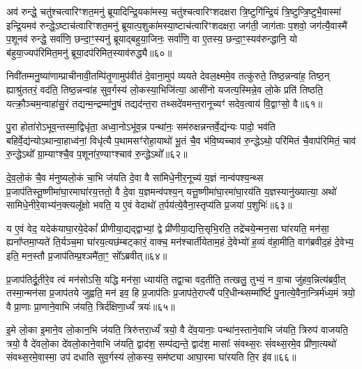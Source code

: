 अव॑ रुन्द्धे॒ चतु॑श्चत्वारिꣳशत॒मनु॑ ब्रूयादिन्द्रि॒यका॑मस्य॒ चतु॑श्चत्वारिꣳशदक्षरा त्रि॒ष्टुगि॑न्द्रि॒यं त्रि॒ष्टुप्त्रि॒ष्टुभै॒वास्मा॑ इन्द्रि॒यमव॑ रुन्द्धे॒\-ऽष्टाच॑त्वारिꣳशत॒मनु॑ ब्रूयात्प॒शुका॑मस्या॒ष्टाच॑त्वारिꣳशदक्षरा॒ जग॑ती॒ जाग॑ताः प॒शवो॒ जग॑त्यै॒वास्मै॑ प॒शूनव॑ रुन्द्धे॒ सर्वा॑णि॒ छन्दा॒ꣳ॒स्यनु॑ ब्रूयाद्बहुया॒जिनः॒ सर्वा॑णि॒ वा ए॒तस्य॒ छन्दा॒ꣳ॒स्यव॑रुन्द्धानि॒ यो ब॑हुया॒ज्यप॑रिमित॒मनु॑ ब्रूया॒दप॑रिमित॒स्याव॑रुद्ध्यै॥६०॥

{\anuvakamend[{का॒मये॑त॒ प्रति॑ष्ठित्यै प॒शून्थ्स॒प्तच॑त्वारिꣳशच्च॥10॥}]}

निवी॑तम्मनु॒ष्या॑णाम्प्राचीनावी॒तम्पि॑तृ॒णामुप॑वीतं दे॒वाना॒मुप॑ व्ययते देवल॒क्ष्ममे॒व तत्कु॑रुते॒ तिष्ठ॒न्नन्वा॑ह॒ तिष्ठ॒न् ह्याश्रु॑ततरं॒ वद॑ति॒ तिष्ठ॒न्नन्वा॑ह सुव॒र्गस्य॑ लो॒कस्या॒भिजि॑त्या॒ आसी॑नो यजत्य॒स्मिन्ने॒व लो॒के प्रति॑ तिष्ठति॒ यत्क्रौ॒ञ्चम॒न्वाहा॑सु॒रं तद्यन्म॒न्द्रम्मा॑नु॒षं तद्यद॑न्त॒रा तथ्सदे॑वमन्त॒रानूच्यꣳ॑ सदेव॒त्वाय॑ वि॒द्वाꣳसो॒ वै॥६१॥

पु॒रा होता॑रो\-ऽभूव॒न्तस्मा॒द्विधृ॑ता॒ अध्वा॒नो\-ऽभू॑व॒न्न पन्था॑नः॒ सम॑रुक्षन्नन्तर्वे॒द्य॑न्यः पादो॒ भव॑ति बहिर्वे॒द्य॑न्यो\-ऽथान्वा॒हाध्व॑नां॒ विधृ॑त्यै प॒थामसꣳ॑रोहा॒याथो॑ भू॒तं चै॒व भ॑वि॒ष्यच्चाव॑ रु॒न्द्धे\-ऽथो॒ परि॑मितं चै॒वाप॑रिमितं॒ चाव॑ रु॒न्द्धे\-ऽथो᳚ ग्रा॒म्याꣳश्चै॒व प॒शूना॑र॒ण्याꣳश्चाव॑ रु॒न्द्धे\-ऽथो᳚॥६२॥

दे॒व॒लो॒कं चै॒व म॑नुष्यलो॒कं चा॒भि ज॑यति दे॒वा वै सा॑मिधे॒नीर॒नूच्य॑ य॒ज्ञं नान्व॑पश्य॒न्थ्स प्र॒जाप॑तिस्तू॒ष्णीमा॑घा॒रमाघा॑रय॒त्ततो॒ वै दे॒वा य॒ज्ञमन्व॑पश्य॒न् यत्तू॒ष्णीमा॑घा॒रमा॑घा॒रय॑ति य॒ज्ञस्यानु॑ख्यात्या॒ अथो॑ सामिधे॒नीरे॒वाभ्य॑न॒क्त्यलू᳚क्षो भवति॒ य ए॒वं वेदाथो॑ त॒र्पय॑त्ये॒वैना॒स्तृप्य॑ति प्र॒जया॑ प॒शुभिः॑॥६३॥

य ए॒वं वेद॒ यदेक॑याघा॒रये॒देकां᳚ प्रीणीया॒द्यद्द्वाभ्यां॒ द्वे प्री॑णीया॒द्यत्ति॒सृभि॒रति॒ तद्रे॑चये॒न्मन॒सा घा॑रयति॒ मन॑सा॒ ह्यना᳚प्तमा॒प्यते॑ ति॒र्यञ्च॒मा घा॑रय॒त्यछ॑म्बट्कारं॒ वाक्च॒ मन॑श्चार्तीयेताम॒हं दे॒वेभ्यो॑ ह॒व्यं व॑हा॒मीति॒ वाग॑ब्रवीद॒हं दे॒वेभ्य॒ इति॒ मन॒स्तौ प्र॒जाप॑तिम्प्र॒श्ञमै॑ता॒ꣳ॒ सो᳚\-ऽब्रवीत्॥६४॥

प्र॒जाप॑तिर्दू॒तीरे॒व त्वं मन॑सो\-ऽसि॒ यद्धि मन॑सा॒ ध्याय॑ति॒ तद्वा॒चा वद॒तीति॒ तत्खलु॒ तुभ्यं॒ न वा॒चा जु॑हव॒न्नित्य॑ब्रवी॒त् तस्मा॒न्मन॑सा प्र॒जाप॑तये जुह्वति॒ मन॑ इव॒ हि प्र॒जाप॑तिः प्र॒जाप॑ते॒राप्त्यै॑ परि॒धीन्थ्सम्मा᳚र्ष्टि पु॒नात्ये॒वैना॒न्त्रिर्म॑ध्य॒मं त्रयो॒ वै प्रा॒णाः प्रा॒णाने॒वाभि ज॑यति॒ त्रिर्द॑क्षिणा॒र्ध्यं॑ त्रयः॑॥६५॥

इ॒मे लो॒का इ॒माने॒व लो॒कान॒भि ज॑यति॒ त्रिरु॑त्तरा॒र्ध्यं॑ त्रयो॒ वै दे॑व॒यानाः॒ पन्था॑न॒स्ताने॒वाभि ज॑यति॒ त्रिरुप॑ वाजयति॒ त्रयो॒ वै दे॑वलो॒का दे॑वलो॒काने॒वाभि ज॑यति॒ द्वाद॑श॒ सम्प॑द्यन्ते॒ द्वाद॑श॒ मासाः᳚ संवथ्स॒रः सं॑वथ्स॒रमे॒व प्री॑णा॒त्यथो॑ संवथ्स॒रमे॒वास्मा॒ उप॑ दधाति सुव॒र्गस्य॑ लो॒कस्य॒ सम॑ष्ट्या आघा॒रमा घा॑रयति ति॒र इ॑व॥६६॥

